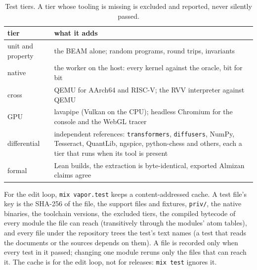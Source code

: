 \begin{table}[h]
\centering\small
\begin{tabularx}{\textwidth}{@{}lX@{}}
\toprule
tier & what it adds \\
\midrule
unit and property & the BEAM alone; random programs, round trips, invariants \\
native & the worker on the host: every kernel against the oracle, bit for bit \\
cross & QEMU for AArch64 and RISC-V; the RVV interpreter against QEMU \\
GPU & lavapipe (Vulkan on the CPU); headless Chromium for the console and the WebGL tracer \\
differential & independent references: \texttt{transformers}, \texttt{diffusers}, NumPy, Tesseract, QuantLib, ngspice, python-chess and others, each a tier that runs when its tool is present \\
formal & Lean builds, the extraction is byte-identical, exported Almizan claims agree \\
\bottomrule
\end{tabularx}
\caption{Test tiers. A tier whose tooling is missing is excluded and reported, never silently passed.}
\end{table}

For the edit loop, \texttt{mix vapor.test} keeps a content-addressed cache. A test file's key is the
SHA-256 of the file, the support files and fixtures, \texttt{priv/}, the native binaries, the toolchain
versions, the excluded tiers, the compiled bytecode of every module the file can reach (transitively
through the modules' atom tables), and every file under the repository trees the test's text names
(a test that reads the documents or the sources depends on them). A file is recorded only when every test in it passed; changing one module reruns only the
files that can reach it. The cache is for the edit loop, not for releases: \texttt{mix test} ignores it.
